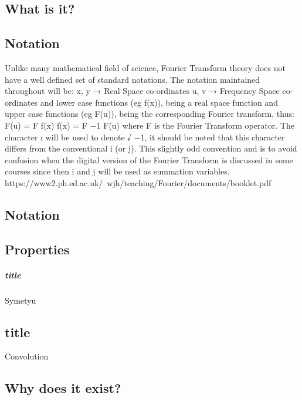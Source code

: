 \documentclass[ams,fleqn,amsmath,amssymb]{article}
\begin{document}
\begin{}
  






  \section{What is it?}
  
  \subsection*{Notation}
  Unlike many mathematical field of science, Fourier Transform theory does not have a well
  defined set of standard notations. The notation maintained throughout will be:
  x, y → Real Space co-ordinates
  u, v → Frequency Space co-ordinates
  and lower case functions (eg f(x)), being a real space function and upper case functions (eg
  F(u)), being the corresponding Fourier transform, thus:
  F(u) = F { f(x)}
  f(x) = F
  −1
  {F(u)}
  where F {} is the Fourier Transform operator.
  The character ı will be used to denote √
  −1, it should be noted that this character differs from
  the conventional i (or j). This slightly odd convention and is to avoid confusion when the
  digital version of the Fourier Transform is discussed in some courses since then i and j will be
  used as summation variables.
  https://www2.ph.ed.ac.uk/~wjh/teaching/Fourier/documents/booklet.pdf
  
  \subsection*{Notation}
  
  \subsection*{Properties}
  
  \subparagraph*{title}{Symetyu}
  \subsection{title}{Convolution}
  
\end{}

\begin{}
  
  \section{Why does it exist?}
  
\end{}
\end{document}
